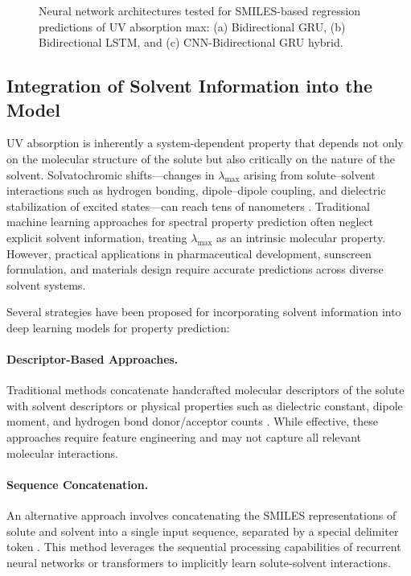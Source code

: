 \documentclass[11pt,a4paper]{article}
\begin{document}
\begin{figure}[H]
\caption{Neural network architectures tested for SMILES-based regression predictions of UV absorption max: (a) Bidirectional GRU, (b) Bidirectional LSTM, and (c) CNN-Bidirectional GRU hybrid.}
\label{fig:architectures}
\end{figure}

\subsection{Integration of Solvent Information into the Model}

UV absorption is inherently a system-dependent property that depends not only on the molecular structure of the solute but also critically on the nature of the solvent. Solvatochromic shifts---changes in $\lambda_{\max}$ arising from solute--solvent interactions such as hydrogen bonding, dipole--dipole coupling, and dielectric stabilization of excited states---can reach tens of nanometers \cite{reichardt2011solvents}. Traditional machine learning approaches for spectral property prediction often neglect explicit solvent information, treating $\lambda_{\max}$ as an intrinsic molecular property. However, practical applications in pharmaceutical development, sunscreen formulation, and materials design require accurate predictions across diverse solvent systems.


Several strategies have been proposed for incorporating solvent information into deep learning models for property prediction:

\paragraph{Descriptor-Based Approaches.} Traditional methods concatenate handcrafted molecular descriptors of the solute with solvent descriptors or physical properties such as dielectric constant, dipole moment, and hydrogen bond donor/acceptor counts \cite{lusci2013deep, boobier2020machine}. While effective, these approaches require feature engineering and may not capture all relevant molecular interactions.


\paragraph{Sequence Concatenation.} An alternative approach involves concatenating the SMILES representations of solute and solvent into a single input sequence, separated by a special delimiter token \cite{schwaller2019molecular, irwin2022chemformer}. This method leverages the sequential processing capabilities of recurrent neural networks or transformers to implicitly learn solute-solvent interactions.
\end{document}
